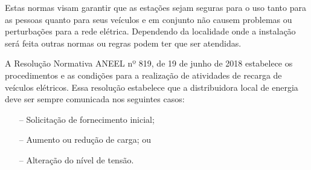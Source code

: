 Estas normas visam garantir que as estações sejam seguras para o uso tanto para as pessoas quanto para seus veículos e em conjunto não causem problemas ou perturbações para a rede elétrica. Dependendo da localidade onde a instalação será feita outras normas ou regras podem ter que ser atendidas.

A Resolução Normativa ANEEL nº 819, de 19 de junho de 2018 \cite{ren2018819} estabelece os procedimentos e as condições para a realização de atividades de recarga de veículos elétricos. Essa resolução estabelece que a distribuidora local de energia deve ser sempre comunicada nos seguintes casos:

\begin{itemize}
    \item[--] Solicitação de fornecimento inicial;
    \item[--] Aumento ou redução de carga; ou
    \item[--] Alteração do nível de tensão.
\end{itemize}


